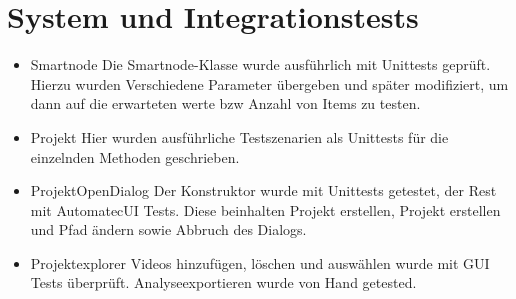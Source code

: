 \chapter{System und Integrationstests}
\begin{itemize}
\item Smartnode \newline
Die Smartnode-Klasse wurde ausführlich mit Unittests geprüft. Hierzu wurden Verschiedene Parameter übergeben und später modifiziert, um dann auf die erwarteten werte bzw Anzahl von Items zu testen.
\item Projekt \newline
Hier wurden ausführliche Testszenarien als Unittests für die einzelnden Methoden geschrieben.
\item ProjektOpenDialog \newline
Der Konstruktor wurde mit Unittests getestet, der Rest mit AutomatecUI Tests. Diese beinhalten Projekt erstellen, Projekt erstellen und Pfad ändern sowie Abbruch des Dialogs.
\item Projektexplorer \newline
Videos hinzufügen, löschen und auswählen wurde mit GUI Tests überprüft. Analyseexportieren wurde von Hand getested.
\end{itemize}